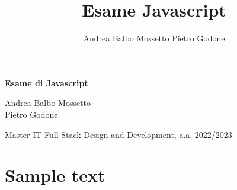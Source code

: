 \documentclass{article}
\author{Andrea Balbo Mossetto \n Pietro Godone}
\title{Esame Javascript}
\begin{document}
	\begin{center}
    \vspace{5ex}
    {\huge \textbf{Esame di Javascript}}
    \vspace{5ex}
\end{center}

\begin{center}
    Andrea Balbo Mossetto \\
    Pietro Godone
\end{center}

\vspace{10ex}

\begin{center}



\vspace{20ex}

Master IT Full Stack Design and Development, a.a. 2022/2023

\end{center}

\newpage 

\tableofcontents

\newpage

\listoffigures

\newpage

\section{Sample text}
\end{document}
